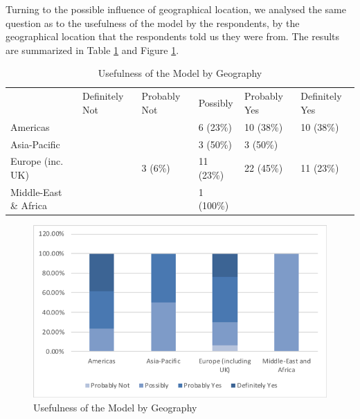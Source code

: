 Turning to the possible influence of geographical location, we analysed the same question as to the usefulness of the model by the respondents, by the geographical location that the respondents told us they were from.  The results are summarized in Table \ref{table:usefulnessbygeo} and Figure \ref{figure:usefulnessbygeo}.

\begin{table}
\caption{Usefulness of the Model by Geography}
\label{table:usefulnessbygeo}
\footnotesize
\begin{tabular}{l p{1.5cm} p{1.5cm} p{1.5cm} p{1.5cm} p{1.5cm}}
 & \centering Definitely Not & 
   \centering Probably Not & 
   \centering Possibly & 
   \centering Probably Yes & 
   \centering Definitely Yes \tabularnewline
Americas              & &         & 6 (23\%)  & 10 (38\%) & 10 (38\%) \\
Asia-Pacific          & &         & 3 (50\%)  & 3 (50\%)  & \\
Europe (inc. UK)      & & 3 (6\%) & 11 (23\%) & 22 (45\%) & 11 (23\%) \\
Middle-East \& Africa & &         & 1 (100\%) &           & \\
\end{tabular}
\end{table}
 
\begin{figure}
\centering
\includegraphics[width=12cm,trim={2 2 2 2},clip]{Figures/prioritisation-usefulness-by-geo}
\caption{Usefulness of the Model by Geography}
\label{figure:usefulnessbygeo}
\end{figure}

